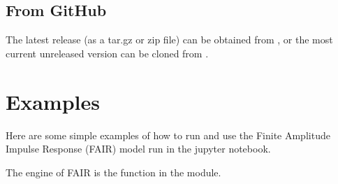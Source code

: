 \documentclass[letterpaper,10pt,english]{sphinxmanual}
\begin{document}
\section{From GitHub}
\label{\detokenize{installation:from-github}}
The latest release (as a tar.gz or zip file) can be obtained from , or the most current unreleased version can be cloned from .


\chapter{Examples}
\label{\detokenize{examples::doc}}\label{\detokenize{examples:examples}}
Here are some simple examples of how to run and use the Finite Amplitude
Impulse Response (FAIR) model run in the jupyter notebook.

\begin{sphinxVerbatim}[commandchars=\\\{\}]
 
\end{sphinxVerbatim}

\begin{sphinxVerbatim}[commandchars=\\\{\}]
 

   

     
\PYG{p}{[}\PYG{p}{]}   
\end{sphinxVerbatim}

The \sphinxquotedblleft{}engine\sphinxquotedblright{} of FAIR is the  function in the 
module.

\begin{sphinxVerbatim}[commandchars=\\\{\}]
   
\end{sphinxVerbatim}
\end{document}
